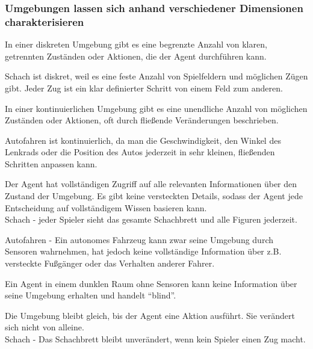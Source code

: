 \subsubsection*{Umgebungen lassen sich anhand verschiedener Dimensionen charakterisieren}
\begin{infoBox}[title=Diskrete Umgebung]
    In einer diskreten Umgebung gibt es eine begrenzte Anzahl von klaren, getrennten Zuständen oder Aktionen, die der Agent durchführen kann.
\end{infoBox}
\begin{infoBox}
     Schach ist diskret, weil es eine feste Anzahl von Spielfeldern und möglichen Zügen gibt. Jeder Zug ist ein klar definierter Schritt von einem Feld zum anderen.
\end{infoBox}
\begin{infoBox}[title=Kontinuierliche Umgebung]
    In einer kontinuierlichen Umgebung gibt es eine unendliche Anzahl von möglichen Zuständen oder Aktionen, oft durch fließende Veränderungen beschrieben.
\end{infoBox}
\begin{infoBox}
     Autofahren ist kontinuierlich, da man die Geschwindigkeit, den Winkel des Lenkrads oder die Position des Autos jederzeit in sehr kleinen, fließenden Schritten anpassen kann.
\end{infoBox}
\begin{infoBox}[title=Beobachtbar]
    Der Agent hat vollständigen Zugriff auf alle relevanten Informationen über den Zustand der Umgebung. Es gibt keine versteckten Details, sodass der Agent jede Entscheidung auf vollständigem Wissen basieren kann.\\
     Schach - jeder Spieler sieht das gesamte Schachbrett und alle Figuren jederzeit.
\end{infoBox}
\begin{infoBox}[title=Teilweise Beobachtbar]
     Autofahren - Ein autonomes Fahrzeug kann zwar seine Umgebung durch Sensoren wahrnehmen, hat jedoch keine vollständige Information über z.B. versteckte Fußgänger oder das Verhalten anderer Fahrer.
\end{infoBox}
\begin{infoBox}[title=Nicht Beobachtbar]
     Ein Agent in einem dunklen Raum ohne Sensoren kann keine Information über seine Umgebung erhalten und handelt \enquote{blind}.
\end{infoBox}
\begin{infoBox}[title=Statisch]
    Die Umgebung bleibt gleich, bis der Agent eine Aktion ausführt. Sie verändert sich nicht von alleine.\\
     Schach - Das Schachbrett bleibt unverändert, wenn kein Spieler einen Zug macht.
\end{infoBox}
